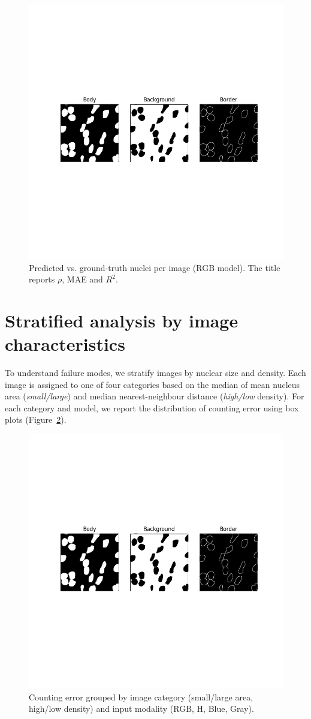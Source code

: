 \documentclass[target=bach,aauheader=,style=]{thud}
\begin{document}
\begin{figure}[ht]
    \centering
    \includegraphics[width=.55\linewidth]{imgs/3ch_binarymask.png}
    \caption{Predicted vs. ground-truth nuclei per image (RGB model). The title reports $\rho$, MAE and $R^2$.}
    \label{fig:scatter}
\end{figure}
\section{Stratified analysis by image characteristics}
\label{sec:strata}
To understand failure modes, we stratify images by nuclear size and density. 
Each image is assigned to one of four categories based on the median of mean nucleus area (\emph{small/large}) and median nearest-neighbour distance (\emph{high/low} density). 
For each category and model, we report the distribution of counting error using box plots (Figure~\ref{fig:box-cats}).

\begin{figure}[ht]
    \centering
    \includegraphics[width=.9\linewidth]{imgs/3ch_binarymask.png}
    \caption{Counting error grouped by image category (small/large area, high/low density) and input modality (RGB, H, Blue, Gray).}
    \label{fig:box-cats}
\end{figure}
\end{document}
